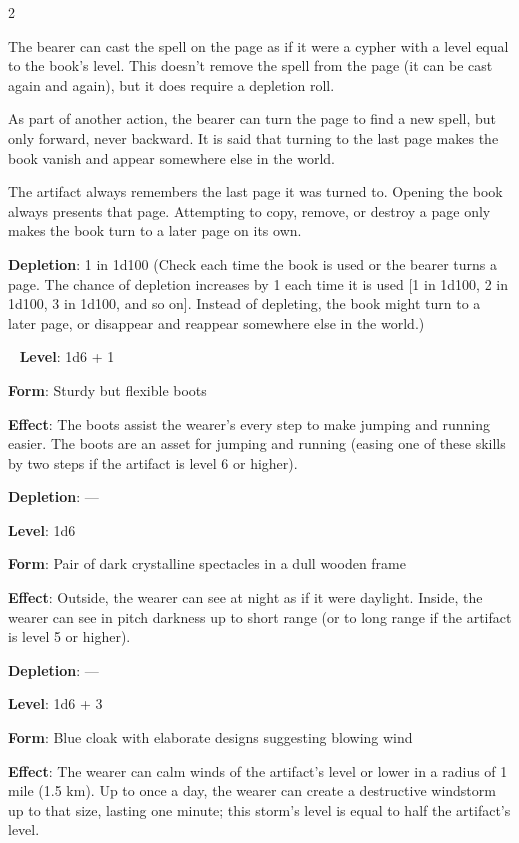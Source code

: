 \begin{multicols}{2}

The bearer can cast the spell on the page as if it were a cypher with a level equal to the book’s level. This doesn’t remove the spell from the page (it can be cast again and again), but it does require a depletion roll. 

As part of another action, the bearer can turn the page to find a new spell, but only forward, never backward. It is said that turning to the last page makes the book vanish and appear somewhere else in the world. 

The artifact always remembers the last page it was turned to. Opening the book always presents that page. Attempting to copy, remove, or destroy a page only makes the book turn to a later page on its own. 

\textbf{Depletion}: 1 in 1d100 (Check each time the book is used or the bearer turns a page. The chance of depletion increases by 1 each time it is used [1 in 1d100, 2 in 1d100, 3 in 1d100, and so on]. Instead of depleting, the book might turn to a later page, or disappear and reappear somewhere else in the world.)

 
\textbf{Level}: 1d6 + 1 

\textbf{Form}: Sturdy but flexible boots 

\textbf{Effect}: The boots assist the wearer’s every step to make jumping and running easier. The boots are an asset for jumping and running (easing one of these skills by two steps if the artifact is level 6 or higher). 

\textbf{Depletion}: — 


\textbf{Level}: 1d6 

\textbf{Form}: Pair of dark crystalline spectacles in a dull wooden frame 

\textbf{Effect}: Outside, the wearer can see at night as if it were daylight. Inside, the wearer can see in pitch darkness up to short range (or to long range if the artifact is level 5 or higher). 

\textbf{Depletion}: — 


\textbf{Level}: 1d6 + 3 

\textbf{Form}: Blue cloak with elaborate designs suggesting blowing wind 

\textbf{Effect}: The wearer can calm winds of the artifact’s level or lower in a radius of 1 mile (1.5 km). Up to once a day, the wearer can create a destructive windstorm up to that size, lasting one minute; this storm’s level is equal to half the artifact’s level. 


\end{multicols}
